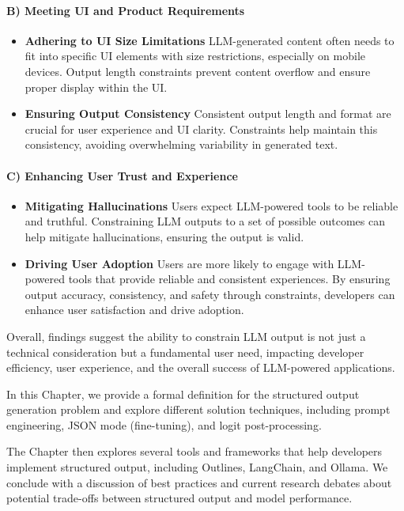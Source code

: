 \paragraph{B) Meeting UI and Product Requirements}
\begin{itemize}
    \item \textbf{Adhering to UI Size Limitations}
LLM-generated content often needs to fit into specific UI elements with size restrictions, especially on mobile devices. Output length constraints prevent content overflow and ensure proper display within the UI.
    \item \textbf{Ensuring Output Consistency}
Consistent output length and format are crucial for user experience and UI clarity. Constraints help maintain this consistency, avoiding overwhelming variability in generated text.
\end{itemize}


\paragraph{C) Enhancing User Trust and Experience}
\begin{itemize}
    \item \textbf{Mitigating Hallucinations}
Users expect LLM-powered tools to be reliable and truthful. Constraining LLM outputs to a set of possible outcomes can help mitigate hallucinations, ensuring the output is valid.
    \item \textbf{Driving User Adoption}
Users are more likely to engage with LLM-powered tools that provide reliable and consistent experiences. By ensuring output accuracy, consistency, and safety through constraints, developers can enhance user satisfaction and drive adoption.
\end{itemize}

Overall, findings suggest the ability to constrain LLM output is not just a technical consideration but a fundamental user need, impacting developer efficiency, user experience, and the overall success of LLM-powered applications.

In this Chapter, we provide a formal definition for the structured output generation problem and explore different solution techniques, including prompt engineering, JSON mode (fine-tuning), and logit post-processing.

The Chapter then explores several tools and frameworks that help developers implement structured output, including Outlines, LangChain, and Ollama. We conclude with a discussion of best practices and current research debates about potential trade-offs between structured output and model performance.

